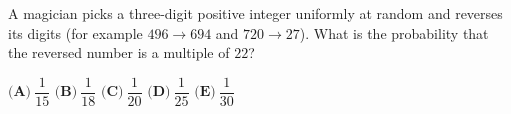 A magician picks a three-digit positive integer uniformly at random and reverses its digits (for example $496\to694$ and $720\to27$). What is the probability that the reversed number is a multiple of $22$?

$\textbf{(A)}\ $$\dfrac1{15}$ \qquad $\textbf{(B)}\ $$\dfrac1{18}$ \qquad $\textbf{(C)}\ $$\dfrac1{20}$ \qquad $\textbf{(D)}\ $$\dfrac1{25}$ \qquad $\textbf{(E)}\ $$\dfrac1{30}$
